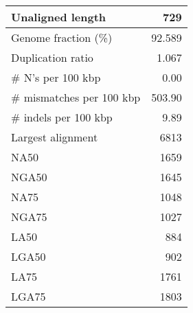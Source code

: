 \documentclass[12pt,a4paper]{article}
\begin{document}
\begin{table}[ht]
\begin{center}
\begin{tabular}{|l*{1}{|r}|}
Unaligned length & 729 \\ \hline
Genome fraction (\%) & 92.589 \\ \hline
Duplication ratio & 1.067 \\ \hline
\# N's per 100 kbp & 0.00 \\ \hline
\# mismatches per 100 kbp & 503.90 \\ \hline
\# indels per 100 kbp & 9.89 \\ \hline
Largest alignment & 6813 \\ \hline
NA50 & 1659 \\ \hline
NGA50 & 1645 \\ \hline
NA75 & 1048 \\ \hline
NGA75 & 1027 \\ \hline
LA50 & 884 \\ \hline
LGA50 & 902 \\ \hline
LA75 & 1761 \\ \hline
LGA75 & 1803 \\ \hline
\end{tabular}
\end{center}
\end{table}
\end{document}
